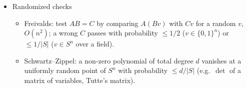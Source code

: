 \begin{itemize}
\item Randomized checks
\begin{itemize}
  \item Freivalds: test $AB = C$ by comparing $A(Bv)$ with $Cv$ for a random $v$, $O(n^2)$; a wrong $C$ passes with probability $\le 1/2$ ($v \in \{0, 1\}^n$) or $\le 1/|S|$ ($v \in S^n$ over a field).
  \item Schwartz–Zippel: a non-zero polynomial of total degree $d$ vanishes at a uniformly random point of $S^n$ with probability $\le d/|S|$ (e.g.\ $\det$ of a matrix of variables, Tutte's matrix).
\end{itemize}
\end{itemize}
